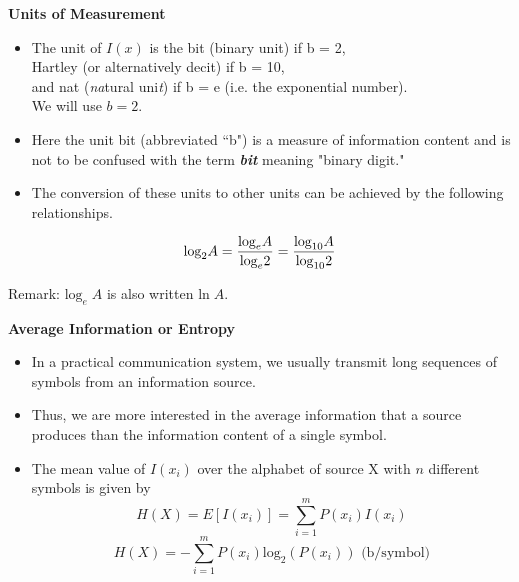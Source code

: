 \documentclass[]{article}
\begin{document}

\noindent \textbf{Units of Measurement}
\begin{itemize}
\item The unit of $I(x)$ is the bit (binary unit) if b = 2, \\ Hartley (or alternatively decit) if b = 10,\\ and nat (\emph{na}tural uni\emph{t}) if b = e (i.e. the exponential number).  \\ We will use $b = 2$. \item Here the unit bit (abbreviated ``b") is a measure of information content and is not to be confused with the term \emph{\textbf{bit}} meaning "binary digit." \item The conversion of these
units to other units can be achieved by the following relationships.
\end{itemize}

\[ \mbox{log}_2A = {\mbox{log}_e A \over \mbox{log} _e 2}   = {\mbox{log}_{10} A \over \mbox{log}_{10} 2}  \]

Remark: $ \mbox{log}_e\; A $ is also written $\mbox{ln}\; A$.



\noindent \textbf{Average Information or Entropy}
\begin{itemize}
\item In a practical communication system, we usually transmit long sequences of symbols from an
information source. \item Thus, we are more interested in the average information that a source produces
than the information content of a single symbol.
\item The mean value of $ I(x_i)$ over the alphabet of source X with $n$ different symbols is given by
\[ H(X) = E[I(x_i)] = \sum^m_{i=1} P(x_i)I(x_i) \]
\[ H(X) =  - \sum^m_{i=1} P(x_i)\mbox{log}_2( P(x_i) ) \mbox{        (b/symbol)}\]
\end{itemize}



\end{document}
